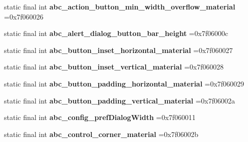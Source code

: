 \begin{DoxyCompactItemize}
\item 
\mbox{\label{classproject4_1_1xaria_1_1R_1_1dimen_af5b9305811df8b9f919553ad48df3f88}} 
static final int {\bfseries abc\+\_\+action\+\_\+button\+\_\+min\+\_\+width\+\_\+overflow\+\_\+material} =0x7f060026
\item 
\mbox{\label{classproject4_1_1xaria_1_1R_1_1dimen_acfb852a62179e6251bb24cf301e08242}} 
static final int {\bfseries abc\+\_\+alert\+\_\+dialog\+\_\+button\+\_\+bar\+\_\+height} =0x7f06000c
\item 
\mbox{\label{classproject4_1_1xaria_1_1R_1_1dimen_aeb241cfe315f75c3372a280e221a300e}} 
static final int {\bfseries abc\+\_\+button\+\_\+inset\+\_\+horizontal\+\_\+material} =0x7f060027
\item 
\mbox{\label{classproject4_1_1xaria_1_1R_1_1dimen_a17ff537bccbe04b580749cde037c4685}} 
static final int {\bfseries abc\+\_\+button\+\_\+inset\+\_\+vertical\+\_\+material} =0x7f060028
\item 
\mbox{\label{classproject4_1_1xaria_1_1R_1_1dimen_a30cbbbc1a9271ee5514b449bf26db69f}} 
static final int {\bfseries abc\+\_\+button\+\_\+padding\+\_\+horizontal\+\_\+material} =0x7f060029
\item 
\mbox{\label{classproject4_1_1xaria_1_1R_1_1dimen_ac76f6ac189d47fde96be0e4b9f68488f}} 
static final int {\bfseries abc\+\_\+button\+\_\+padding\+\_\+vertical\+\_\+material} =0x7f06002a
\item 
\mbox{\label{classproject4_1_1xaria_1_1R_1_1dimen_a6e40d59ff812ae23809ebd56988d8e2a}} 
static final int {\bfseries abc\+\_\+config\+\_\+pref\+Dialog\+Width} =0x7f060011
\item 
\mbox{\label{classproject4_1_1xaria_1_1R_1_1dimen_a109519686ec518ebf559c45be2998429}} 
static final int {\bfseries abc\+\_\+control\+\_\+corner\+\_\+material} =0x7f06002b
\item 
\mbox{\label{classproject4_1_1xaria_1_1R_1_1dimen_a0aca315ea2957fb18b2863bc35ce86b4}} 

\end{DoxyCompactItemize}
